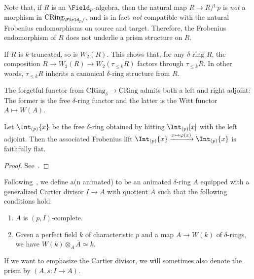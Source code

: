 \documentclass[10pt]{amsart}
\begin{document}
\begin{remark}
\label{rem:naive_frobenius_lift}
Note that, if $R$ is an $\Field_p$-algebra, then the natural map $R\to R/{}^{\mathbb{L}}p$ is \emph{not} a morphism in $\mathrm{CRing}_{\Field_p/}$, and is in fact \emph{not} compatible with the natural Frobenius endomorphisms on source and target. Therefore, the Frobenius endomorphism of $R$ does not underlie a prism structure on $R$.
\end{remark}

\begin{remark}
\label{rem:witt_postnikov_truncation}
If $R$ is $k$-truncated, so is $W_2(R)$. This shows that, for any $\delta$-ring $R$, the composition $R\to W_2(R)\to W_2(\tau_{\leq k}R)$ factors through $\tau_{\leq k}R$. In other words, $\tau_{\leq k}R$ inherits a canonical $\delta$-ring structure from $R$.
\end{remark}


\begin{remark}
The forgetful functor from $\mathrm{CRing}_\delta\to \mathrm{CRing}$ admits both a left and right adjoint: The former is the free $\delta$-ring functor and the latter is the Witt functor $A\mapsto W(A)$.
\end{remark}

\begin{lemma}
\label{lem:extracting_phi_roots}
 Let $\Int_{(p)}\{x\}$ be the free $\delta$-ring obtained by hitting $\Int_{(p)}[x]$ with the left adjoint. Then the associated Frobenius lift $\Int_{(p)}\{x\}\xrightarrow{x\mapsto \varphi(x)} \Int_{(p)}\{x\}$ is faithfully flat.
\end{lemma}
\begin{proof}
See~\cite[Lemma 2.11]{Bhatt2022-ee}.
\end{proof}

\begin{definition}
\label{defn:define_prisms}
Following~\cite[Def. 2.4]{bhatt2022prismatization}, we define a(n animated)  to be an animated $\delta$-ring $A$ equipped with a generalized Cartier divisor $I\to A$ with quotient $\overline{A}$ such that the following conditions hold:
\begin{enumerate}
   \item $A$ is $(p,I)$-complete.
   \item Given a perfect field $k$ of characteristic $p$ and a map $A\to W(k)$ of $\delta$-rings, we have $W(k)\otimes_A\overline{A}\simeq k$.
\end{enumerate}
If we want to emphasize the Cartier divisor, we will sometimes also denote the prism by $(A,s:I\to A)$.
\end{definition}
\end{document}
